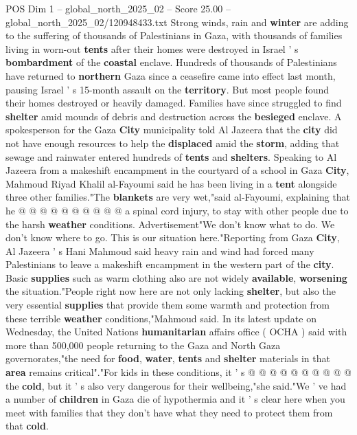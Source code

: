 \begin{textsample}{POS Dim 1 – global\_north\_2025\_02 – Score 25.00 – global\_north\_2025\_02/120948433.txt}  \label{ex:f1_pos_440}
Strong winds, rain and \textbf{winter} are adding to the suffering of thousands of Palestinians in Gaza, with thousands of families living in worn-out \textbf{tents} after their homes were destroyed in Israel ' s \textbf{bombardment} of the \textbf{coastal} enclave.
Hundreds of thousands of Palestinians have returned to \textbf{northern} Gaza since a ceasefire came into effect last month, pausing Israel ' s 15-month assault on the \textbf{territory}.
But most people found their homes destroyed or heavily damaged.
Families have since struggled to find \textbf{shelter} amid mounds of debris and destruction across the \textbf{besieged} enclave.
A spokesperson for the Gaza \textbf{City} municipality told Al Jazeera that the \textbf{city} did not have enough resources to help the \textbf{displaced} amid the \textbf{storm}, adding that sewage and rainwater entered hundreds of \textbf{tents} and \textbf{shelters}.
Speaking to Al Jazeera from a makeshift encampment in the courtyard of a school in Gaza \textbf{City}, Mahmoud Riyad Khalil al-Fayoumi said he has been living in a \textbf{tent} alongside three other families."The \textbf{blankets} are very wet,"said al-Fayoumi, explaining that he @ @ @ @ @ @ @ @ @ @ a spinal cord injury, to stay with other people due to the harsh \textbf{weather} conditions.
Advertisement"We don't know what to do.
We don't know where to go.
This is our situation here."Reporting from Gaza \textbf{City}, Al Jazeera ' s Hani Mahmoud said heavy rain and wind had forced many Palestinians to leave a makeshift encampment in the western part of the \textbf{city}.
Basic \textbf{supplies} such as warm clothing also are not widely \textbf{available}, \textbf{worsening} the situation."People right now here are not only lacking \textbf{shelter}, but also the very essential \textbf{supplies} that provide them some warmth and protection from these terrible \textbf{weather} conditions,"Mahmoud said.
In its latest update on Wednesday, the United Nations \textbf{humanitarian} affairs office ( OCHA ) said with more than 500,000 people returning to the Gaza and North Gaza governorates,"the need for \textbf{food}, \textbf{water}, \textbf{tents} and \textbf{shelter} materials in that \textbf{area} remains critical"."For kids in these conditions, it ' s @ @ @ @ @ @ @ @ @ @ the \textbf{cold}, but it ' s also very dangerous for their wellbeing,"she said."We ' ve had a number of \textbf{children} in Gaza die of hypothermia and it ' s clear here when you meet with families that they don't have what they need to protect them from that \textbf{cold}.

\end{textsample}
